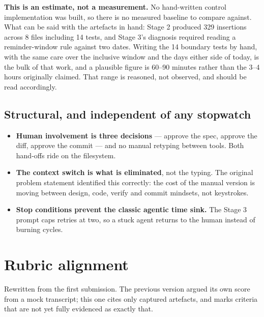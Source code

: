 \documentclass[11pt,a4paper]{article}
\begin{document}
\textbf{This is an estimate, not a measurement.} No hand-written control
implementation was built, so there is no measured baseline to compare against.
What can be said with the artefacts in hand: Stage 2 produced 329 insertions
across 8 files including 14 tests, and Stage 3's diagnosis required reading a
reminder-window rule against two dates. Writing the 14 boundary tests by hand,
with the same care over the inclusive window and the days either side of today,
is the bulk of that work, and a plausible figure is 60--90 minutes rather than
the 3--4 hours originally claimed. That range is reasoned, not observed, and
should be read accordingly.

\subsection{Structural, and independent of any stopwatch}

\begin{itemize}
  \item \textbf{Human involvement is three decisions} --- approve the spec,
        approve the diff, approve the commit --- and no manual retyping between
        tools. Both hand-offs ride on the filesystem.
  \item \textbf{The context switch is what is eliminated}, not the typing. The
        original problem statement identified this correctly: the cost of the
        manual version is moving between design, code, verify and commit
        mindsets, not keystrokes.
  \item \textbf{Stop conditions prevent the classic agentic time sink.} The
        Stage 3 prompt caps retries at two, so a stuck agent returns to the
        human instead of burning cycles.
\end{itemize}

\section{Rubric alignment}

Rewritten from the first submission. The previous version argued its own score
from a mock transcript; this one cites only captured artefacts, and marks
criteria that are not yet fully evidenced as exactly that.
\end{document}
